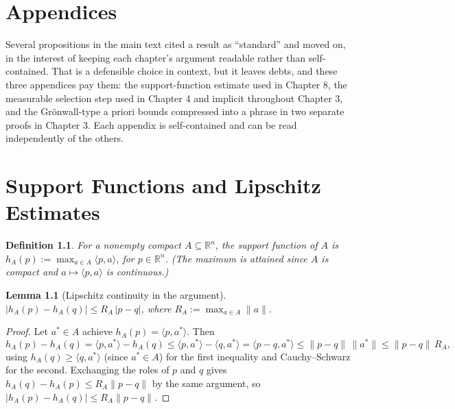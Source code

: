 \documentclass[11pt]{report}
\newtheorem{lemma}{Lemma}[chapter]
\newtheorem{definition}{Definition}[chapter]
\begin{document}
\appendix

\chapter*{Appendices}

Several propositions in the main text cited a result as ``standard''
and moved on, in the interest of keeping each chapter's argument
readable rather than self-contained. That is a defensible choice in
context, but it leaves debts, and these three appendices pay them:
the support-function estimate used in Chapter 8, the measurable
selection step used in Chapter 4 and implicit throughout Chapter 3,
and the Gr\"onwall-type a priori bounds compressed into a phrase in
two separate proofs in Chapter 3. Each appendix is self-contained and
can be read independently of the others.

\chapter{Support Functions and Lipschitz Estimates}

\begin{definition}
For a nonempty compact $A \subseteq \mathbb{R}^n$, the support function
of $A$ is $h_A(p) := \max_{a \in A} \langle p, a \rangle$, for
$p \in \mathbb{R}^n$. (The maximum is attained since $A$ is compact and
$a \mapsto \langle p,a \rangle$ is continuous.)
\end{definition}

\begin{lemma}[Lipschitz continuity in the argument]
\label{lem:hlip}
$|h_A(p) - h_A(q)| \leq R_A\, |p-q|$, where $R_A := \max_{a \in A} \|a\|$.
\end{lemma}
\begin{proof}
Let $a^\ast \in A$ achieve $h_A(p) = \langle p, a^\ast \rangle$. Then
\[
h_A(p) - h_A(q) = \langle p, a^\ast \rangle - h_A(q) \leq \langle p, a^\ast \rangle - \langle q, a^\ast \rangle = \langle p-q, a^\ast \rangle \leq \|p-q\|\,\|a^\ast\| \leq \|p-q\|\, R_A,
\]
using $h_A(q) \geq \langle q, a^\ast \rangle$ (since $a^\ast \in A$) for
the first inequality and Cauchy--Schwarz for the second. Exchanging the
roles of $p$ and $q$ gives $h_A(q) - h_A(p) \leq R_A\|p-q\|$ by the same
argument, so $|h_A(p)-h_A(q)| \leq R_A\|p-q\|$.
\end{proof}
\end{document}
